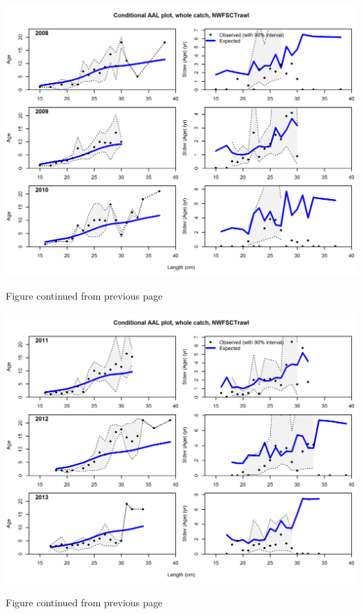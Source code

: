 \documentclass[12pt,]{article}
\begin{document}
\includegraphics{./r4ss/plots_mod1/comp_condAALfit_Andre_plotsflt8mkt0_page2.png}

\begin{center} 

              Figure continued from previous page 

             \end{center}

\includegraphics{./r4ss/plots_mod1/comp_condAALfit_Andre_plotsflt8mkt0_page3.png}

\begin{center} 

              Figure continued from previous page 

             \end{center}
\end{document}
